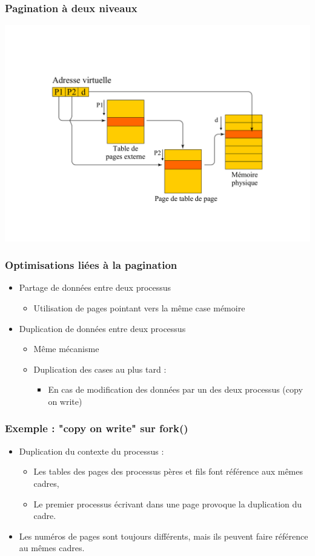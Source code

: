\begin{frame}
\frametitle{Pagination à deux niveaux}
\includegraphics[width=\textwidth]{../illustration/memoire_paginee_deux_niveaux_calcul.pdf}
\end{frame}


\begin{frame}
\frametitle{Optimisations liées à la pagination}
\begin{itemize}
\item Partage de données entre deux processus
\begin{itemize}
\item Utilisation de pages pointant vers la même case mémoire
\end{itemize}
\item Duplication de données entre deux processus
\begin{itemize}
\item Même mécanisme
\item Duplication des cases au plus tard :
\begin{itemize}
\item En cas de modification des données par un des deux processus (copy on write)
\end{itemize}
\end{itemize}
\end{itemize}
\end{frame}


\begin{frame}
\frametitle{Exemple : "copy on write" sur fork()}
\begin{itemize}
\item Duplication du contexte du processus :
\begin{itemize}
\item Les tables des pages des processus pères et fils font référence aux mêmes cadres,
\item Le premier processus écrivant dans une page provoque la duplication du cadre.
\end{itemize}
\item Les numéros de pages sont toujours différents, mais ils peuvent faire référence au mêmes cadres.
\end{itemize}
\end{frame}

